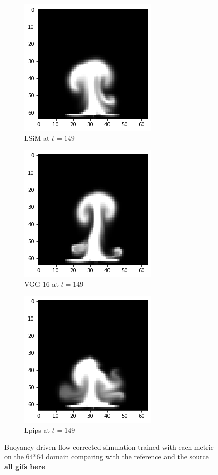 \documentclass[a4paper,12pt,twoside]{report}
\begin{document}
\begin{figure}
\begin{subfigure}{0.32\textwidth}
	\end{subfigure}
	\begin{subfigure}{0.32\textwidth}
		\centering
		\includegraphics[scale=0.5]{buoyancy_low/lsim}
		\caption{LSiM at $t=149$}
	\end{subfigure}
	\begin{subfigure}{0.32\textwidth}
		\centering
		\includegraphics[scale=0.5]{buoyancy_low/vgg}
		\caption{VGG-16 at $t=149$}
	\end{subfigure}
	\begin{subfigure}{0.32\textwidth}
		\centering
		\includegraphics[scale=0.5]{buoyancy_low/lpips}
		\caption{Lpips at $t=149$}
	\end{subfigure}
	\caption{Buoyancy driven flow corrected simulation trained with each metric on the 64*64 domain comparing with the reference and the source \href{https://github.com/w191444052/sol-data/tree/master/buoyancy_low}{\bf{all gifs here}}}
	\label{sol buoyancy low}
\end{figure}



\clearpage

\clearpage

\clearpage


%

\end{document}
